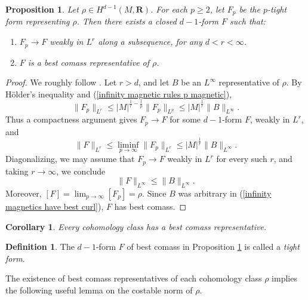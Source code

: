 \documentclass[reqno,11pt]{amsart}
\newcommand{\RR}{\mathbf{R}}
\newcommand{\dfn}[1]{\emph{#1}\index{#1}}
\newtheorem{proposition}[theorem]{Proposition}
\newtheorem{corollary}[theorem]{Corollary}
\theoremstyle{definition}
\newtheorem{definition}[theorem]{Definition}
\numberwithin{equation}{section}
\begin{document}
\begin{proposition}\label{existence infinity}
Let $\rho \in H^{d - 1}(M, \RR)$.
For each $p \geq 2$, let $F_p$ be the $p$-tight form representing $\rho$. Then there exists a closed $d - 1$-form $F$ such that:
\begin{enumerate}
\item $F_p \to F$ weakly in $L^r$ along a subsequence, for any $d < r < \infty$.
\item $F$ is a best comass representative of $\rho$.
\end{enumerate}
\end{proposition}
\begin{proof}
We roughly follow \cite[\S3]{Lindqvist14}.
Let $r > d$, and let $B$ be an $L^\infty$ representative of $\rho$.
By H\"older's inequality and (\ref{infinity magnetic rules p magnetic}),
\begin{equation}\label{uniform bounds in p by best curl}
	\|F_p\|_{L^r} \leq |M|^{\frac{1}{r} - \frac{1}{p}} \|F_p\|_{L^p} \leq |M|^{\frac{1}{r}} \|B\|_{L^\infty}.
\end{equation}
Thus a compactness argument gives $F_p \to F$ for some $d - 1$-form $F$, weakly in $L^r$, and 
$$\|F\|_{L^r} \leq \liminf_{p \to \infty} \|F_p\|_{L^r} \leq |M|^{\frac{1}{r}} \|B\|_{L^\infty}.$$
Diagonalizing, we may assume that $F_p \to F$ weakly in $L^r$ for every such $r$, and taking $r \to \infty$, we conclude 
\begin{equation}\label{infinity magnetics have best curl}
	\|F\|_{L^\infty} \leq \|B\|_{L^\infty}.
\end{equation}
Moreover, $[F] = \lim_{p \to \infty} [F_p] = \rho$.
Since $B$ was arbitrary in (\ref{infinity magnetics have best curl}), $F$ has best comass.
\end{proof}

\begin{corollary}
Every cohomology class has a best comass representative.
\end{corollary}

\begin{definition}
The $d - 1$-form $F$ of best comass in Proposition \ref{existence infinity} is called a \dfn{tight form}.
\end{definition}

The existence of best comass representatives of each cohomology class $\rho$ implies the following useful lemma on the costable norm of $\rho$.
\end{document}
